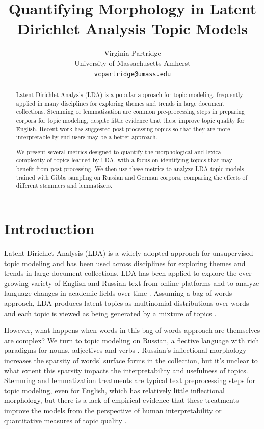 \documentclass[11pt,a4paper]{article}
\title{Quantifying Morphology in Latent Dirichlet Analysis Topic Models}
\author{Virginia Partridge \\
  University of Massachusetts Amherst\\
  \texttt{vcpartridge@umass.edu}
}
\date{}
\begin{document}
\maketitle
\begin{abstract}
    Latent Dirichlet Analysis (LDA) is a popular approach for topic modeling, frequently applied in many disciplines for exploring themes and trends in large document collections. Stemming or lemmatization are common pre-processing steps in preparing corpora for topic modeling, despite little evidence that these improve topic quality for English. Recent work has suggested post-processing topics so that they are more interpretable by end users may be a better approach.

    We present several metrics designed to quantify the morphological and lexical complexity of topics learned by LDA, with a focus on identifying topics that may benefit from post-processing. We then use these metrics to analyze LDA topic models trained with Gibbs sampling on Russian and German corpora, comparing the effects of different stemmers and lemmatizers.
\end{abstract}

\section{Introduction}
Latent Dirichlet Analysis (LDA) is a widely adopted approach for unsupervised topic modeling and has been used across disciplines for exploring themes and trends in large document collections. LDA has been applied to explore the ever-growing variety of English and Russian text from online platforms and to analyze language changes in academic fields over time \cite{koltsova2013,mcfarland2013differentiating, vogel-jurafsky-2012-said, mitrofanova2015probabilistic}. Assuming a bag-of-words approach, LDA produces latent topics as multinomial distributions over words and each topic is viewed as being generated by a mixture of topics \cite{blei2003,steyvers2007probabilistic}.

However, what happens when words in this bag-of-words approach are themselves are complex? We turn to topic modeling on Russian, a flective language with rich paradigms for nouns, adjectives and verbs \cite{wade2020comprehensive}. Russian's inflectional morphology increases the sparsity of words' surface forms in the collection, but it's unclear to what extent this sparsity impacts the interpretability and usefulness of topics. Stemming and lemmatization treatments are typical text preprocessing steps for topic modeling, even for English, which has relatively little inflectional morphology, but there is a lack of empirical evidence that these treatments improve the models from the perspective of human interpretability or quantitative measures of topic quality \cite{schofield-mimno-2016-comparing}.
\end{document}
